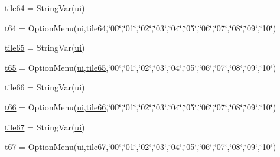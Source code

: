 \begin{DoxyCompactItemize}
\item 
\mbox{\hyperlink{namespacegui_a19cdc2ff759a4ddb510a64dee3011d9c}{tile64}} = String\+Var(\mbox{\hyperlink{namespacegui_a40ab7281456eadbea2dc2038f5c24fa1}{ui}})
\item 
\mbox{\hyperlink{namespacegui_a153819d784faac94130fb5aa11c944d7}{t64}} = Option\+Menu(\mbox{\hyperlink{namespacegui_a40ab7281456eadbea2dc2038f5c24fa1}{ui}},\mbox{\hyperlink{namespacegui_a19cdc2ff759a4ddb510a64dee3011d9c}{tile64}},\char`\"{}00\char`\"{},\char`\"{}01\char`\"{},\char`\"{}02\char`\"{},\char`\"{}03\char`\"{},\char`\"{}04\char`\"{},\char`\"{}05\char`\"{},\char`\"{}06\char`\"{},\char`\"{}07\char`\"{},\char`\"{}08\char`\"{},\char`\"{}09\char`\"{},\char`\"{}10\char`\"{})
\item 
\mbox{\hyperlink{namespacegui_a16b2bd5f38987cf5d4e029ef779de240}{tile65}} = String\+Var(\mbox{\hyperlink{namespacegui_a40ab7281456eadbea2dc2038f5c24fa1}{ui}})
\item 
\mbox{\hyperlink{namespacegui_a9918aaf5271447b2e374c6d6085a0a7a}{t65}} = Option\+Menu(\mbox{\hyperlink{namespacegui_a40ab7281456eadbea2dc2038f5c24fa1}{ui}},\mbox{\hyperlink{namespacegui_a16b2bd5f38987cf5d4e029ef779de240}{tile65}},\char`\"{}00\char`\"{},\char`\"{}01\char`\"{},\char`\"{}02\char`\"{},\char`\"{}03\char`\"{},\char`\"{}04\char`\"{},\char`\"{}05\char`\"{},\char`\"{}06\char`\"{},\char`\"{}07\char`\"{},\char`\"{}08\char`\"{},\char`\"{}09\char`\"{},\char`\"{}10\char`\"{})
\item 
\mbox{\hyperlink{namespacegui_ae611eb5c07dd6a1b2c69b5d1367f7e1d}{tile66}} = String\+Var(\mbox{\hyperlink{namespacegui_a40ab7281456eadbea2dc2038f5c24fa1}{ui}})
\item 
\mbox{\hyperlink{namespacegui_ae64ba32cdbadf068fcc5d130d160f2eb}{t66}} = Option\+Menu(\mbox{\hyperlink{namespacegui_a40ab7281456eadbea2dc2038f5c24fa1}{ui}},\mbox{\hyperlink{namespacegui_ae611eb5c07dd6a1b2c69b5d1367f7e1d}{tile66}},\char`\"{}00\char`\"{},\char`\"{}01\char`\"{},\char`\"{}02\char`\"{},\char`\"{}03\char`\"{},\char`\"{}04\char`\"{},\char`\"{}05\char`\"{},\char`\"{}06\char`\"{},\char`\"{}07\char`\"{},\char`\"{}08\char`\"{},\char`\"{}09\char`\"{},\char`\"{}10\char`\"{})
\item 
\mbox{\hyperlink{namespacegui_a6385015d5e2e403c5f8d30ef5339646e}{tile67}} = String\+Var(\mbox{\hyperlink{namespacegui_a40ab7281456eadbea2dc2038f5c24fa1}{ui}})
\item 
\mbox{\hyperlink{namespacegui_ae7cb1d419e0c3fdbb1131162c9ea1944}{t67}} = Option\+Menu(\mbox{\hyperlink{namespacegui_a40ab7281456eadbea2dc2038f5c24fa1}{ui}},\mbox{\hyperlink{namespacegui_a6385015d5e2e403c5f8d30ef5339646e}{tile67}},\char`\"{}00\char`\"{},\char`\"{}01\char`\"{},\char`\"{}02\char`\"{},\char`\"{}03\char`\"{},\char`\"{}04\char`\"{},\char`\"{}05\char`\"{},\char`\"{}06\char`\"{},\char`\"{}07\char`\"{},\char`\"{}08\char`\"{},\char`\"{}09\char`\"{},\char`\"{}10\char`\"{})

\end{DoxyCompactItemize}
